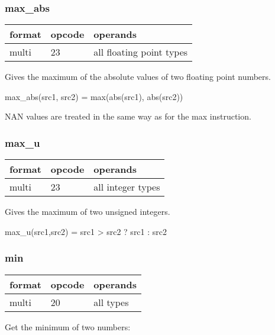 \documentclass[forwardcom.tex]{subfiles}
\begin{document}
\subsubsection{max\_abs}
\label{table:maxAbsInstruction}
\begin{tabular}{|p{12mm}|p{12mm}|p{110mm}|}
\hline
\bfseries format & \bfseries opcode & \bfseries operands \\ \hline
multi & 23 & all floating point types \\ \hline
\end{tabular}
\vspace{2mm}

Gives the maximum of the absolute values of two floating point numbers.
\vspace{2mm}

max\_abs(src1, src2) = max(abs(src1), abs(src2))
\vspace{2mm}

NAN values are treated in the same way as for the max instruction.

\subsubsection{max\_u}
\label{table:maxUInstruction}
\begin{tabular}{|p{12mm}|p{12mm}|p{110mm}|}
\hline
\bfseries format & \bfseries opcode & \bfseries operands \\ \hline
multi & 23 & all integer types \\ \hline
\end{tabular}
\vspace{2mm}

Gives the maximum of two unsigned integers.
\vspace{2mm}

max\_u(src1,src2) = src1 \textgreater{} src2 ? src1 : src2

\subsubsection{min}
\label{table:minInstruction}
\begin{tabular}{|p{12mm}|p{12mm}|p{110mm}|}
\hline
\bfseries format & \bfseries opcode & \bfseries operands \\ \hline
multi & 20 & all types \\ \hline
\end{tabular}
\vspace{2mm}

Get the minimum of two numbers:
\end{document}
